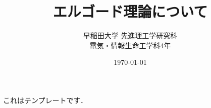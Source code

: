 \documentclass[a4paper,10pt]{ltjsarticle}
\title{エルゴード理論について}
\author{早稲田大学 先進理工学研究科\\電気・情報生命工学科4年}
\date{\today}
\begin{document}
\maketitle

これはテンプレートです．


% 
% 
\printbibliography[title=参考文献]

% 
\end{document}
